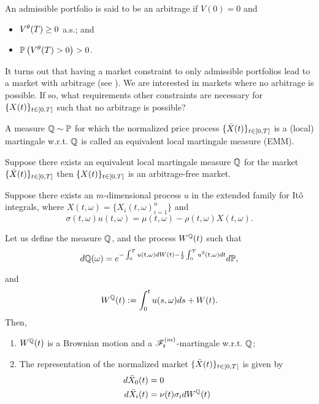 \documentclass[../TGMAFFIRO.tex]{subfiles}
\begin{document}
\begin{definition}
	An admissible portfolio is said to be an arbitrage if $V(0) = 0$ and
	\begin{itemize}
		\item $V^\theta(T) \geq 0$ a.s.; and
		\item $\mathbb{P}\left(V^\theta(T) > 0 \right) > 0$.
	\end{itemize}
\end{definition}

It turns out that having a market constraint to only admissible portfolios lead to a market with arbitrage (see ). We are interested in markets where no arbitrage is possible. If so, what requirements other constraints are necessary for $\{X(t)\}_{t\in[0,T]}$ such that no arbitrage is possible?

\begin{definition}
	A measure $\mathbb{Q} \sim \mathbb{P}$ for which the normalized price process $\{\bar{X}(t)\}_{t\in[0,T]}$ is a (local) martingale w.r.t. $\mathbb{Q}$ is called an equivalent local martingale measure (EMM).
\end{definition}

\begin{proposition}
	Suppose there exists an equivalent local martingale measure $\mathbb{Q}$ for the market $\{\bar{X}(t)\}_{t\in[0,T]}$ then $\{X(t)\}_{t\in[0,T]}$ is an arbitrage-free market.
\end{proposition}

\begin{proposition}\label{prop:qmartingale-market}
	Suppose there exists an $m$-dimensional process $u$ in the extended family for It\^o integrals, where $X(t, \omega) = \{X_i(t,\omega)_{i=1}^n\}$ and
	\begin{equation}
		\sigma(t,\omega)u(t,\omega) = \mu(t, \omega) - \rho(t, \omega)X(t,\omega).
	\end{equation}

Let us define the measure $\mathbb{Q}$, and the process $W^{\mathbb{Q}}(t)$ such that
\[
	d\mathbb{Q}(\omega) = e^{-\int_0^Tu(t,\omega) dW(t) - \frac{1}{2}\int_0^Tu^2(t,\omega) dt}d\mathbb{P},
\]

and
\[
	W^{\mathbb{Q}}(t) := \int_0^tu(s,\omega) ds + W(t).
\]
Then,
\begin{enumerate}
	\item $W^{\mathbb{Q}}(t)$ is a Brownian motion and a $\mathscr{F}_t^{(m)}$-martingale w.r.t. $\mathbb{Q}$;
	\item The representation of the normalized market $\{\bar{X}(t)\}_{t\in[0,T]}$ is given by
	\begin{align*}
		d\bar{X}_0(t) &= 0 \\
		d\bar{X}_i(t) &= \nu(t)\sigma_i dW^{\mathbb{Q}}(t)
	\end{align*}
\end{enumerate}
\end{proposition}
\end{document}
